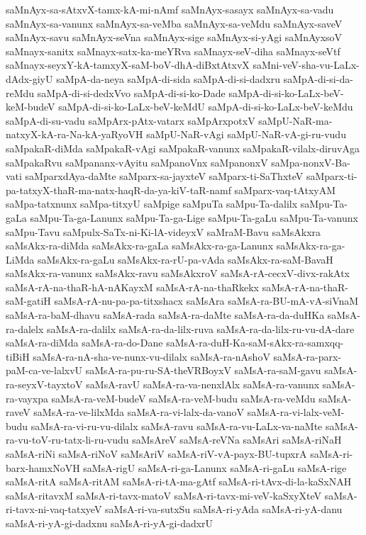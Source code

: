 {saMnAyx-sa-sAtxvX-tamx-kA-mi-nAmf
saMnAyx-sasayx
saMnAyx-sa-vadu
saMnAyx-sa-vanunx
saMnAyx-sa-veMba
saMnAyx-sa-veMdu
saMnAyx-saveV
saMnAyx-savu
saMnAyx-seVna
saMnAyx-sige
saMnAyx-si-yAgi
saMnAyxsoV
saMnayx-sanitx
saMnayx-satx-ka-meYRva
saMnayx-seV-diha
saMnayx-seVtf
saMnayx-seyxY-kA-tamxyX-saM-boV-dhA-diBxtAtxvX
saMni-veV-sha-vu-LaLx-dAdx-giyU
saMpA-da-neya
saMpA-di-sida
saMpA-di-si-dadxru
saMpA-di-si-da-reMdu
saMpA-di-si-dedxVvo
saMpA-di-si-ko-Dade
saMpA-di-si-ko-LaLx-beV-keM-budeV
saMpA-di-si-ko-LaLx-beV-keMdU
saMpA-di-si-ko-LaLx-beV-keMdu
saMpA-di-su-vadu
saMpArx-pAtx-vatarx
saMpArxpotxV
saMpU-NaR-ma-natxyX-kA-ra-Na-kA-yaRyoVH
saMpU-NaR-vAgi
saMpU-NaR-vA-gi-ru-vudu
saMpakaR-diMda
saMpakaR-vAgi
saMpakaR-vanunx
saMpakaR-vilalx-diruvAga
saMpakaRvu
saMpananx-vAyitu
saMpanoVnx
saMpanonxV
saMpa-nonxV-Ba-vati
saMparxdAya-daMte
saMparx-sa-jayxteV
saMparx-ti-SaThxteV
saMparx-ti-pa-tatxyX-thaR-ma-natx-haqR-da-ya-kiV-taR-namf
saMparx-vaq-tAtxyAM
saMpa-tatxnunx
saMpa-titxyU
saMpige
saMpuTa
saMpu-Ta-dalilx
saMpu-Ta-gaLa
saMpu-Ta-ga-Lanunx
saMpu-Ta-ga-Lige
saMpu-Ta-gaLu
saMpu-Ta-vanunx
saMpu-Tavu
saMpulx-SaTx-ni-Ki-lA-videyxV
saMraM-Bavu
saMsAkxra
saMsAkx-ra-diMda
saMsAkx-ra-gaLa
saMsAkx-ra-ga-Lanunx
saMsAkx-ra-ga-LiMda
saMsAkx-ra-gaLu
saMsAkx-ra-rU-pa-vAda
saMsAkx-ra-saM-BavaH
saMsAkx-ra-vanunx
saMsAkx-ravu
saMsAkxroV
saMsA-rA-cecxV-divx-rakAtx
saMsA-rA-na-thaR-hA-nAKayxM
saMsA-rA-na-thaRkekx
saMsA-rA-na-thaR-saM-gatiH
saMsA-rA-nu-pa-pa-titxshacx
saMsAra
saMsA-ra-BU-mA-vA-siVnaM
saMsA-ra-baM-dhavu
saMsA-rada
saMsA-ra-daMte
saMsA-ra-da-duHKa
saMsA-ra-dalelx
saMsA-ra-dalilx
saMsA-ra-da-lilx-ruva
saMsA-ra-da-lilx-ru-vu-dA-dare
saMsA-ra-diMda
saMsA-ra-do-Dane
saMsA-ra-duH-Ka-saM-sAkx-ra-samxqq-tiBiH
saMsA-ra-nA-sha-ve-nunx-vu-dilalx
saMsA-ra-nAshoV
saMsA-ra-parx-paM-ca-ve-lalxvU
saMsA-ra-pu-ru-SA-theVRBoyxV
saMsA-ra-saM-gavu
saMsA-ra-seyxV-tayxtoV
saMsA-ravU
saMsA-ra-va-nenxlAlx
saMsA-ra-vanunx
saMsA-ra-vayxpa
saMsA-ra-veM-budeV
saMsA-ra-veM-budu
saMsA-ra-veMdu
saMsA-raveV
saMsA-ra-ve-lilxMda
saMsA-ra-vi-lalx-da-vanoV
saMsA-ra-vi-lalx-veM-budu
saMsA-ra-vi-ru-vu-dilalx
saMsA-ravu
saMsA-ra-vu-LaLx-va-naMte
saMsA-ra-vu-toV-ru-tatx-li-ru-vudu
saMsAreV
saMsA-reVNa
saMsAri
saMsA-riNaH
saMsA-riNi
saMsA-riNoV
saMsAriV
saMsA-riV-vA-payx-BU-tupxrA
saMsA-ri-barx-hamxNoVH
saMsA-rigU
saMsA-ri-ga-Lanunx
saMsA-ri-gaLu
saMsA-rige
saMsA-ritA
saMsA-ritAM
saMsA-ri-tA-ma-gAtf
saMsA-ri-tAvx-di-la-kaSxNAH
saMsA-ritavxM
saMsA-ri-tavx-matoV
saMsA-ri-tavx-mi-veV-kaSxyXteV
saMsA-ri-tavx-ni-vaq-tatxyeV
saMsA-ri-va-sutxSu
saMsA-ri-yAda
saMsA-ri-yA-danu
saMsA-ri-yA-gi-dadxnu
saMsA-ri-yA-gi-dadxrU
}
